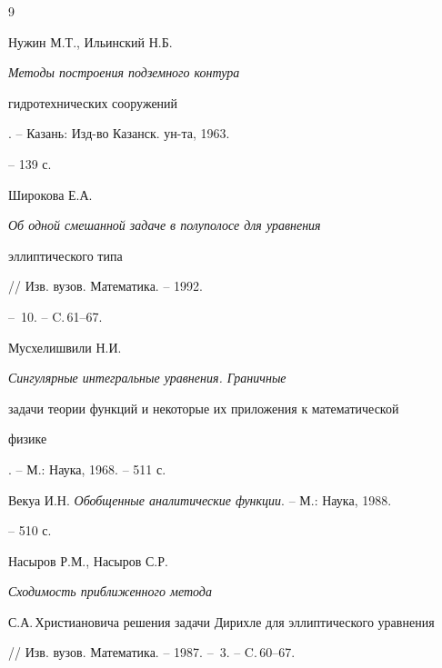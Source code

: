 \begin{thebibliography}{9}







Нужин М.Т., Ильинский Н.Б. {\em Методы построения подземного контура


гидротехнических сооружений}. -- Казань: Изд-во Казанск. ун-та, 1963.


-- 139 с.




Широкова Е.А. {\em Об одной смешанной задаче в полуполосе для уравнения


эллиптического типа} //  Изв. вузов. Математика. -- 1992.


-- \No\,10. -- C.\,61--67.




Мусхелишвили Н.И. {\em Сингулярные интегральные уравнения. Граничные


задачи теории функций и некоторые их приложения к математической


физике}. -- М.: Наука, 1968. -- 511 с.




Векуа И.Н. {\em Обобщенные аналитические функции}. -- М.: Наука, 1988.


-- 510 с.




Насыров Р.М., Насыров С.Р. {\em Сходимость приближенного метода


С.А.\,Христиановича решения задачи Дирихле для эллиптического уравнения} 


// Изв. вузов. Математика. -- 1987. -- \No\,3. -- C.\,60--67.





\end{thebibliography}





\vskip 1cm














\label{end}





